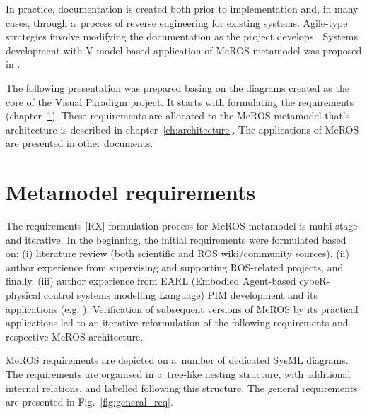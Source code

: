 \documentclass[11pt,oneside,a4paper]{report}
\begin{document}
	In practice, documentation is created both prior to implementation and, in many cases, through a~process of reverse  engineering \cite{canfora2007new} for existing systems. Agile-type strategies involve modifying the documentation as the project develops \cite{habib2021systematic}. Systems development with V-model-based application of MeROS metamodel was proposed in \cite{winiarski2025-v-model}.
			
	The following presentation was prepared basing on the diagrams created as the core of the Visual Paradigm project. It starts with formulating the requirements (chapter~\ref{ch:requirements}). These requirements are allocated to the MeROS metamodel that's architecture is described in chapter~\ref{ch:architecture}. The applications of MeROS are presented in other documents.
	
	
\chapter{Metamodel requirements}
\label{ch:requirements}
	The requirements [RX] formulation process for MeROS metamodel is multi-stage and iterative. In the beginning, the initial requirements were formulated based on: (i) literature review (both scientific and ROS wiki/community sources), (ii) author experience from supervising and supporting ROS-related projects, and finally, (iii) author experience from EARL (Embodied Agent-based cybeR-physical control systems modelling Language) \cite{earl2020} PIM development and its applications (e.g. \cite{tasker2020,karwowski2021hubero,en14206693-grav-comp}). Verification of subsequent versions of MeROS by its practical applications led to an iterative reformulation of the following requirements and respective MeROS architecture.
	
	MeROS requirements are depicted on a~number of dedicated SysML diagrams. The requirements are organised in a~tree-like nesting structure, with additional internal relations, and labelled following this structure. The general requirements are presented in Fig.~\ref{fig:general_req}. 
		
\end{document}
